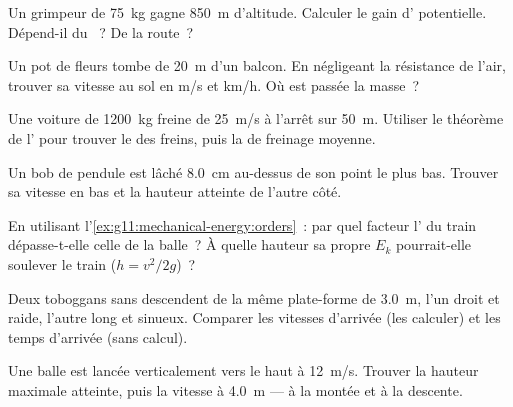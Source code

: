 \begin{exercise}[$\star$]\label{exo:g11:mechanical-energy:2}
Un grimpeur de \qty{75}{kg} gagne \qty{850}{m} d'altitude. Calculer le
gain d' potentielle. Dépend-il
du ~? De la
route~?
\end{exercise}

\begin{exercise}[$\star$]\label{exo:g11:mechanical-energy:3}
Un pot de fleurs tombe de \qty{20}{m} d'un balcon. En négligeant la
résistance de l'air, trouver sa vitesse au sol en \unit{m/s} et
\unit{km/h}. Où est passée la masse~?
\end{exercise}

\begin{exercise}[$\star$]\label{exo:g11:mechanical-energy:4}
Une voiture de \qty{1200}{kg} freine de \qty{25}{m/s} à l'arrêt sur
\qty{50}{m}. Utiliser le théorème de l'
 pour trouver le
 des freins, puis la
 de freinage moyenne.
\end{exercise}

\begin{exercise}[$\star$]\label{exo:g11:mechanical-energy:5}
Un bob de pendule est lâché \qty{8.0}{cm} au-dessus de son point le
plus bas. Trouver sa vitesse en bas et la hauteur atteinte de l'autre
côté.
\end{exercise}

\begin{exercise}[$\star\star$]\label{exo:g11:mechanical-energy:6}
En utilisant l'\cref{ex:g11:mechanical-energy:orders}~: par quel
facteur l' du train
dépasse-t-elle celle de la balle~? À quelle hauteur sa propre $E_k$
pourrait-elle soulever le train ($h = v^2/2g$)~?
\end{exercise}

\begin{exercise}[$\star\star$]\label{exo:g11:mechanical-energy:7}
Deux toboggans sans  descendent de la même plate-forme de
\qty{3.0}{m}, l'un droit et raide, l'autre long et sinueux. Comparer
les vitesses d'arrivée (les calculer) et les temps d'arrivée (sans
calcul).
\end{exercise}

\begin{exercise}[$\star\star$]\label{exo:g11:mechanical-energy:8}
Une balle est lancée verticalement vers le haut à \qty{12}{m/s}.
Trouver la hauteur maximale atteinte, puis la vitesse à \qty{4.0}{m}
--- à la montée et à la descente.
\end{exercise}

